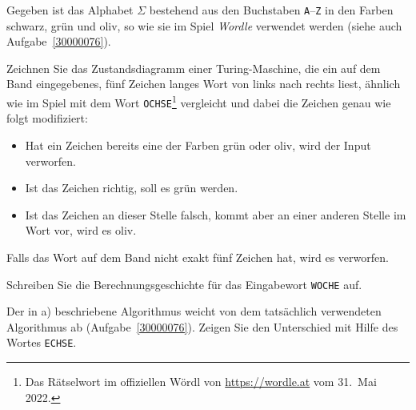 \bgroup
{}
\def\schwarz#1{{\texttt{#1}}}
\def\gruen#1{{\color{wordlegreen}\texttt{#1}}}
\def\oliv#1{{\color{wordleolive}\texttt{#1}}}

Gegeben ist das Alphabet $\Sigma$ bestehend aus den Buchstaben
\texttt{A}--\texttt{Z}
in den Farben schwarz, grün und oliv, so wie sie im Spiel {\em Wordle}
verwendet werden (siehe auch Aufgabe~\ref{30000076}).
\begin{teilaufgaben}
\item
Zeichnen Sie das Zustandsdiagramm einer Turing-Maschine, die 
ein auf dem Band eingegebenes, fünf Zeichen langes Wort von links
nach rechts liest,
ähnlich wie im Spiel mit dem Wort \texttt{OCHSE}\footnote{Das Rätselwort im
offiziellen Wördl von \url{https://wordle.at} vom 31.~Mai 2022.}
vergleicht und dabei die Zeichen genau wie folgt modifiziert:
\begin{itemize}
\item
Hat ein Zeichen bereits eine der Farben grün oder oliv, wird der Input
verworfen.
\item
Ist das Zeichen richtig, soll es grün werden.
\item
Ist das Zeichen an dieser Stelle falsch, kommt aber an einer anderen Stelle im 
Wort vor, wird es oliv.
\end{itemize}
Falls das Wort auf dem Band nicht exakt fünf Zeichen hat, wird es verworfen.
\item
Schreiben Sie die Berechnungsgeschichte für das Eingabewort \texttt{WOCHE}
auf.
\item
Der in a) beschriebene Algorithmus weicht von dem tatsächlich verwendeten
Algorithmus ab (Aufgabe~\ref{30000076}).
Zeigen Sie den Unterschied mit Hilfe des Wortes \texttt{ECHSE}.
\end{teilaufgaben}

